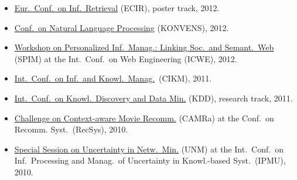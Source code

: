 \documentclass[line,mm]{res}
\newcounter{x}
\newcounter{y}
\newcounter{z}
\begin{document}
\begin{resume}
\begin{itemize}
{  Anal.\ and Tools for Online Community Manag.}\ (MAMA), at
  INFORMATIK, 2013
\item \href{http://ecir2012.upf.edu/}{Eur.\ Conf.\ on Inf.\ Retrieval} (ECIR), poster track, 2012.  
\item \href{http://www.oegai.at/konvens2012/}{Conf.\ on Natural Language
  Processing} (KONVENS), 2012. 
\item \href{http://spim-workshop.org/}{Workshop on Personalized
  Inf.\ Manag.: Linking Soc.\ and Semant.\ Web} (SPIM) at the
  Int.\ Conf.\ on Web Engineering (ICWE), 2012. 
\item \href{http://www.cikm2011.org/}{Int.\ Conf.\ on Inf.\ and Knowl.\ Manag.}\ (CIKM), 2011.
\item \href{http://www.sigkdd.org/kdd/2011/}{Int.\ Conf.\ on 
  Knowl.\ Discovery and Data Min.} (KDD), research track, 2011.
\item \href{http://www.dai-labor.de/camra2010/}{Challenge on
  Context-aware Movie Recomm.} (CAMRa) at the Conf.\ on  
  Recomm. Syst.\ (RecSys), 2010.   
\item \href{http://www.dai-labor.de/unm2010/}{Special Session on Uncertainty in Netw.\ Min.} (UNM) at the
  Int.\ Conf.\ on Inf.\ Processing and Manag.\ of
  Uncertainty in Knowl.-based Syst.\ (IPMU), 2010. 
\end{itemize}


\end{resume}
\end{document}

